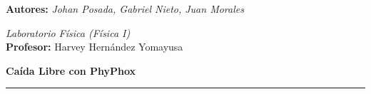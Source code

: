 \begin{@twocolumntrue}
\begin{minipage}{0.677\textwidth}
\begin{center}
            \large{\textbf{Autores: }\textit{Johan Posada, Gabriel Nieto, Juan Morales}} %
            \vspace{2mm}
    
            \large{\textit{Laboratorio Física (Física I) }}\\
            \textbf{Profesor: } Harvey Hernández Yomayusa
            \vspace{2mm}

            \textbf{Caída Libre con PhyPhox}\\
\footnotesize   
        \end{center}
\end{minipage}
\noindent\textcolor{rojopro}{\rule{\textwidth}{3pt}}
\end{@twocolumntrue}